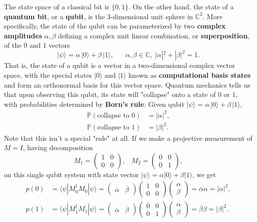 \documentclass{article}
\theoremstyle{definition}
\begin{document}
The state space of a classical bit is $\{0, 1\}$. On the other hand, the state of a \textbf{quantum bit}, or a \textbf{qubit}, is the 3-dimensional unit sphere in $\mathbb{C}^2$. More specifically, the state of the qubit can be parameterized by two \textbf{complex amplitudes} $\alpha, \beta$ defining a complex unit linear combination, or \textbf{superposition}, of the 0 and 1 vectors
\[|\psi \rangle = \alpha \,|0 \rangle + \beta \, | 1\rangle, \;\;\;\;\;\; \alpha, \beta \in \mathbb{C}, \; |\alpha|^2 + |\beta|^2 = 1.\]
That is, the state of a qubit is a vector in a two-dimensional complex vector space, with the special states $|0\rangle$ and $|1\rangle$ known as \textbf{computational basis states} and form an orthonormal basis for this vector space. Quantum mechanics tells us that upon observing this qubit, its state will "collapse" onto a state of $0$ or $1$, with probabilities determined by \textbf{Born's rule}: Given qubit $|\psi \rangle = \alpha \,|0 \rangle + \beta \, | 1\rangle$,
\begin{align*}
  \mathbb{P}(\text{collapse to } 0) & = |\alpha|^2, \\
  \mathbb{P}(\text{collapse to } 1) & = |\beta|^2.
\end{align*}
Note that this isn't a special "rule" at all. If we make a projective measurement of $M = I$, having decomposition
\[M_1 = \begin{pmatrix} 1 & 0 \\ 0 & 0 \end{pmatrix}, \;\;\; M_2 = \begin{pmatrix} 0 & 0 \\ 0 & 1 \end{pmatrix},\]
on this single qubit system with state vector $|\psi \rangle = \alpha |0\rangle + \beta |1 \rangle$, we get
\begin{align*}
  p(0) & = \langle \psi | M_0^\dagger M_0 | \psi \rangle = \begin{pmatrix} \overline{\alpha} & \overline{\beta} \end{pmatrix} \begin{pmatrix} 1 & 0 \\ 0&0 \end{pmatrix} \begin{pmatrix} \alpha \\ \beta \end{pmatrix} = \overline{\alpha} \alpha = |\alpha|^2, \\
  p(1) & = \langle \psi | M_1^\dagger M_1 | \psi \rangle = \begin{pmatrix} \overline{\alpha} & \overline{\beta} \end{pmatrix} \begin{pmatrix} 0 & 0 \\ 0&1 \end{pmatrix} \begin{pmatrix} \alpha \\ \beta \end{pmatrix} = \overline{\beta} \beta = |\beta|^2.
\end{align*}
\end{document}
